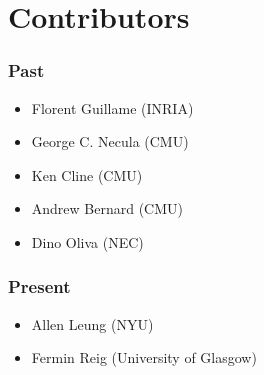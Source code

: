 \section{Contributors}
 \subsubsection{Past}
   \begin{itemize} 
    \item Florent Guillame (INRIA)
    \item George C. Necula (CMU)
    \item Ken Cline (CMU)
    \item Andrew Bernard (CMU)
    \item Dino Oliva (NEC)
   \end{itemize} 

\subsubsection{Present}
  \begin{itemize}
    \item Allen Leung (NYU)
    \item Fermin Reig (University of Glasgow)
  \end{itemize}
